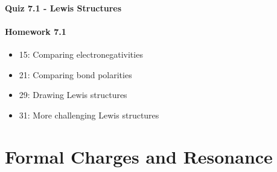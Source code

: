 \documentclass[12pt, openany, letterpaper]{memoir}
\begin{document}
\paragraph*{Quiz 7.1 - Lewis Structures}
\paragraph*{Homework 7.1}
\begin{itemize}
  \item 15: Comparing electronegativities
  \item 21: Comparing bond polarities
  \item 29: Drawing Lewis structures
  \item 31: More challenging Lewis structures
\end{itemize}

\section{Formal Charges and Resonance}
\end{document}

